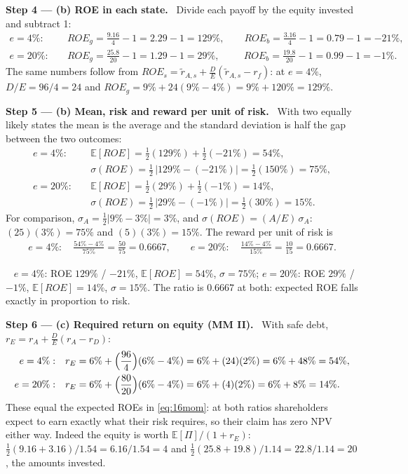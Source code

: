 \documentclass[11pt,a4paper]{article}
\numberwithin{equation}{section}
\newcommand{\step}[2]{\par\smallskip\noindent\textbf{Step #1 --- #2.}~}
\newcommand{\answer}[1]{\par\smallskip\noindent\fbox{\textbf{Answer #1.}}~}
\newcommand{\E}{\mathbb{E}}
\begin{document}
\step{4}{(b) ROE in each state} Divide each payoff by the equity invested and subtract 1:
\begin{align}
  e=4\%:&\quad ROE_g=\frac{9.16}{4}-1=2.29-1=129\%,\qquad ROE_b=\frac{3.16}{4}-1=0.79-1=-21\%, \nonumber\\
  e=20\%:&\quad ROE_g=\frac{25.8}{20}-1=1.29-1=29\%,\qquad\ \ ROE_b=\frac{19.8}{20}-1=0.99-1=-1\%. \nonumber
\end{align}
The same numbers follow from $ROE_s=\tilde r_{A,s}+\frac{D}{E}(\tilde r_{A,s}-r_f)$: at $e=4\%$,
$D/E=96/4=24$ and $ROE_g=9\%+24(9\%-4\%)=9\%+120\%=129\%$.

\step{5}{(b) Mean, risk and reward per unit of risk} With two equally likely states the mean is the
average and the standard deviation is half the gap between the two outcomes:
\begin{align}
  e=4\%:&\quad \E[ROE]=\tfrac12(129\%)+\tfrac12(-21\%)=54\%, \label{eq:16mom}\\
        &\quad \sigma(ROE)=\tfrac12\,|129\%-(-21\%)|=\tfrac12(150\%)=75\%, \nonumber\\
  e=20\%:&\quad \E[ROE]=\tfrac12(29\%)+\tfrac12(-1\%)=14\%, \nonumber\\
        &\quad \sigma(ROE)=\tfrac12\,|29\%-(-1\%)|=\tfrac12(30\%)=15\%. \nonumber
\end{align}
For comparison, $\sigma_A=\tfrac12|9\%-3\%|=3\%$, and $\sigma(ROE)=(A/E)\,\sigma_A$: $(25)(3\%)=75\%$ and
$(5)(3\%)=15\%$. The reward per unit of risk is
\begin{align}
  e=4\%:\quad \frac{54\%-4\%}{75\%}=\frac{50}{75}=0.6667,\qquad
  e=20\%:\quad \frac{14\%-4\%}{15\%}=\frac{10}{15}=0.6667. \label{eq:16sharpe}
\end{align}
\answer{(b)} $e=4\%$: ROE $129\%$ / $-21\%$, $\E[ROE]=54\%$, $\sigma=75\%$; $e=20\%$: ROE $29\%$ /
$-1\%$, $\E[ROE]=14\%$, $\sigma=15\%$. The ratio is $0.6667$ at both: expected ROE falls exactly in
proportion to risk.

\step{6}{(c) Required return on equity (MM II)} With safe debt, $r_E=r_A+\frac{D}{E}(r_A-r_D)$:
\begin{align}
  e=4\%:&\quad r_E=6\%+\Bigl(\frac{96}{4}\Bigr)(6\%-4\%)=6\%+(24)(2\%)=6\%+48\%=54\%, \label{eq:16rE}\\
  e=20\%:&\quad r_E=6\%+\Bigl(\frac{80}{20}\Bigr)(6\%-4\%)=6\%+(4)(2\%)=6\%+8\%=14\%. \nonumber
\end{align}
These equal the expected ROEs in \eqref{eq:16mom}: at both ratios shareholders expect to earn
exactly what their risk requires, so their claim has zero NPV either way. Indeed the equity is worth
$\E[\Pi]/(1+r_E)$: $\tfrac12(9.16+3.16)/1.54=6.16/1.54=4$ and $\tfrac12(25.8+19.8)/1.14=22.8/1.14=20$, the
amounts invested.
\end{document}
